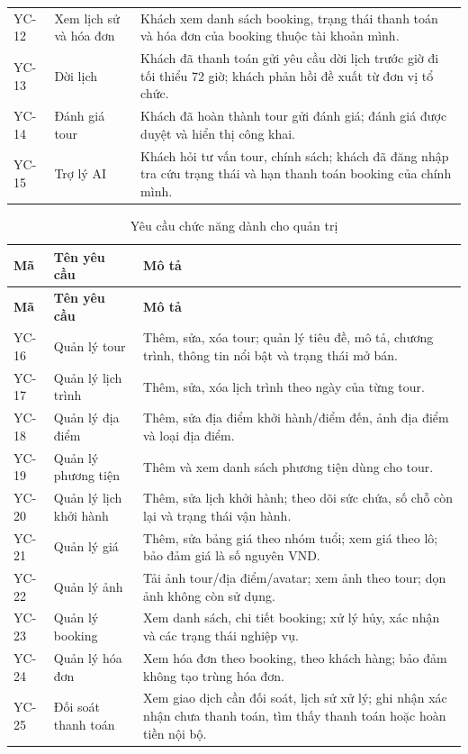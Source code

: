 \begin{longtable}{@{}C{1.35cm}L{4.0cm}L{9.5cm}@{}}
YC-12 & Xem lịch sử và hóa đơn & Khách xem danh sách booking, trạng thái thanh toán và hóa đơn của booking thuộc tài khoản mình.\\
YC-13 & Dời lịch & Khách đã thanh toán gửi yêu cầu dời lịch trước giờ đi tối thiểu 72 giờ; khách phản hồi đề xuất từ đơn vị tổ chức.\\
YC-14 & Đánh giá tour & Khách đã hoàn thành tour gửi đánh giá; đánh giá được duyệt và hiển thị công khai.\\
YC-15 & Trợ lý AI & Khách hỏi tư vấn tour, chính sách; khách đã đăng nhập tra cứu trạng thái và hạn thanh toán booking của chính mình.\\
\end{longtable}

\begin{longtable}{@{}C{1.35cm}L{4.0cm}L{9.5cm}@{}}
\caption{Yêu cầu chức năng dành cho quản trị}
\label{tab:yc-admin}\\
\toprule
\textbf{Mã} & \textbf{Tên yêu cầu} & \textbf{Mô tả}\\
\midrule
\endfirsthead
\toprule
\textbf{Mã} & \textbf{Tên yêu cầu} & \textbf{Mô tả}\\
\midrule
\endhead
\bottomrule
\endfoot
YC-16 & Quản lý tour & Thêm, sửa, xóa tour; quản lý tiêu đề, mô tả, chương trình, thông tin nổi bật và trạng thái mở bán.\\
YC-17 & Quản lý lịch trình & Thêm, sửa, xóa lịch trình theo ngày của từng tour.\\
YC-18 & Quản lý địa điểm & Thêm, sửa địa điểm khởi hành/điểm đến, ảnh địa điểm và loại địa điểm.\\
YC-19 & Quản lý phương tiện & Thêm và xem danh sách phương tiện dùng cho tour.\\
YC-20 & Quản lý lịch khởi hành & Thêm, sửa lịch khởi hành; theo dõi sức chứa, số chỗ còn lại và trạng thái vận hành.\\
YC-21 & Quản lý giá & Thêm, sửa bảng giá theo nhóm tuổi; xem giá theo lô; bảo đảm giá là số nguyên VND.\\
YC-22 & Quản lý ảnh & Tải ảnh tour/địa điểm/avatar; xem ảnh theo tour; dọn ảnh không còn sử dụng.\\
YC-23 & Quản lý booking & Xem danh sách, chi tiết booking; xử lý hủy, xác nhận và các trạng thái nghiệp vụ.\\
YC-24 & Quản lý hóa đơn & Xem hóa đơn theo booking, theo khách hàng; bảo đảm không tạo trùng hóa đơn.\\
YC-25 & Đối soát thanh toán & Xem giao dịch cần đối soát, lịch sử xử lý; ghi nhận xác nhận chưa thanh toán, tìm thấy thanh toán hoặc hoàn tiền nội bộ.\\

\end{longtable}
